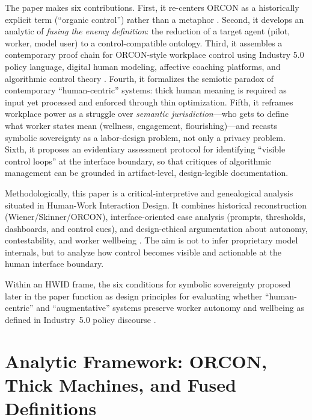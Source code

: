 \documentclass[runningheads]{llncs}
\begin{document}
The paper makes six contributions. First, it re-centers ORCON as a historically explicit term (``organic control'') rather than a metaphor \cite{skinner1960pigeons}. Second, it develops an analytic of \emph{fusing the enemy definition}: the reduction of a target agent (pilot, worker, model user) to a control-compatible ontology. Third, it assembles a contemporary proof chain for ORCON-style workplace control using Industry 5.0 policy language, digital human modeling, affective coaching platforms, and algorithmic control theory \cite{breque2021industry,siemensPSXHuman,siemensHumanAdvanced,cxtoday2022cogito,kellogg2020algorithms}. Fourth, it formalizes the semiotic paradox of contemporary ``human-centric'' systems: thick human meaning is required as input yet processed and enforced through thin optimization. Fifth, it reframes workplace power as a struggle over \emph{semantic jurisdiction}---who gets to define what worker states mean (wellness, engagement, flourishing)---and recasts symbolic sovereignty as a labor-design problem, not only a privacy problem. Sixth, it proposes an evidentiary assessment protocol for identifying ``visible control loops'' at the interface boundary, so that critiques of algorithmic management can be grounded in artifact-level, design-legible documentation.

Methodologically, this paper is a critical-interpretive and genealogical analysis situated in Human-Work Interaction Design. It combines historical reconstruction (Wiener/Skinner/ORCON), interface-oriented case analysis (prompts, thresholds, dashboards, and control cues), and design-ethical argumentation about autonomy, contestability, and worker wellbeing \cite{geertz1973interpretation,kellogg2020algorithms,disalvo2012adversarial}. The aim is not to infer proprietary model internals, but to analyze how control becomes visible and actionable at the human interface boundary.

Within an HWID frame, the six conditions for symbolic sovereignty proposed later in the paper function as design principles for evaluating whether ``human-centric'' and ``augmentative'' systems preserve worker autonomy and wellbeing as defined in Industry~5.0 policy discourse \cite{breque2021industry,hwid2026cfp}.

\section{Analytic Framework: ORCON, Thick Machines, and Fused Definitions}
\end{document}
